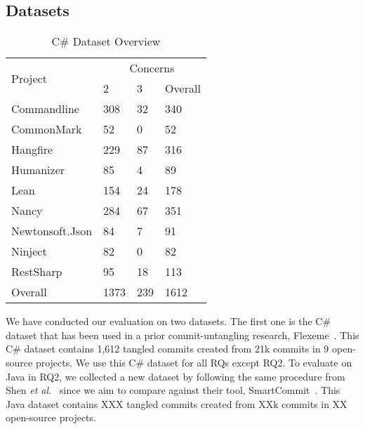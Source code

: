 \subsection{Datasets}

\begin{table}[t]
	\caption{C\# Dataset Overview}
	\vspace{-0.1in}
	\begin{center}
		\footnotesize
		\tabcolsep 4pt
		\renewcommand{\arraystretch}{1} \begin{tabular}{p{3cm}<{\centering}|p{0.8cm}<{\centering}p{0.8cm}<{\centering}p{0.8cm}<{\centering}}
			
			\hline
			\multirow{2}{*}{Project}                  & \multicolumn{3}{c}{Concerns}\\
			\cline{2-4}
			                     & 2 & 3& Overall\\
			\hline
			
			Commandline        &  308 & 32  &   340        \\
			CommonMark        &  52 & 0  &   52        \\
			Hangfire        &  229 & 87  &   316        \\
			Humanizer        &  85 & 4  &   89        \\
			Lean        &  154 & 24  &   178        \\
			Nancy        &  284 & 67  &   351        \\
			Newtonsoft.Json        &  84 & 7  &   91        \\
			Ninject        &  82 & 0  &  82        \\
			RestSharp        &  95 & 18  &   113        \\
			\hline
			Overall        &  1373 & 239  &  1612        \\
			\hline
		\end{tabular}
		\label{C-dataset}
	\end{center}
\end{table}




We have conducted our evaluation on two datasets. The first one is the
C\# dataset that has been used in a prior commit-untangling research,
Flexeme~\cite{flexeme-fse20}. This C\# dataset contains 1,612 tangled
commits created from 21k commits in 9 open-source projects. We use
this C\# dataset for all RQs except RQ2. To evaluate {\tool} on Java
in RQ2, we collected a new dataset by following the same procedure
from Shen {\em et al.}~\cite{smartcommit-fse21} since we aim to
compare {\tool} against their tool,
SmartCommit~\cite{smartcommit-fse21}. This Java dataset contains XXX
tangled commits created from XXk commits in XX open-source projects.


